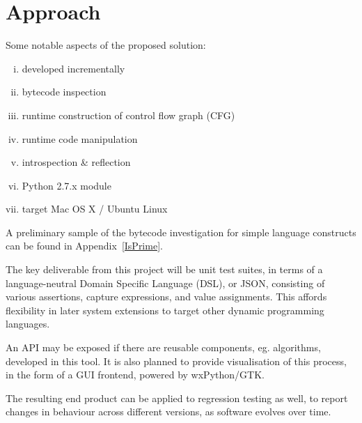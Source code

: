 \documentclass{icldt}
\numberwithin{equation}{section}       %
\begin{document}
\section{Approach}
Some notable aspects of the proposed solution:
\begin{enumerate}[i.]
	\item developed incrementally
	\item bytecode inspection
	\item runtime construction of control flow graph (CFG)
	\item runtime code manipulation
	\item introspection \& reflection
	\item Python 2.7.x module
	\item target Mac OS X / Ubuntu Linux
\end{enumerate}

A preliminary sample of the bytecode investigation for simple language constructs can be found in Appendix~\ref{IsPrime}.

The key deliverable from this project will be unit test suites, in terms of a language-neutral Domain Specific Language (DSL), or JSON, consisting of various assertions, capture expressions, and value assignments. This affords flexibility in later system extensions to target other dynamic programming languages.

An API may be exposed if there are reusable components, eg. algorithms, developed in this tool. It is also planned to provide visualisation of this process, in the form of a GUI frontend, powered by wxPython/GTK.

The resulting end product can be applied to regression testing as well, to report changes in behaviour across different versions, as software evolves over time.
\end{document}
